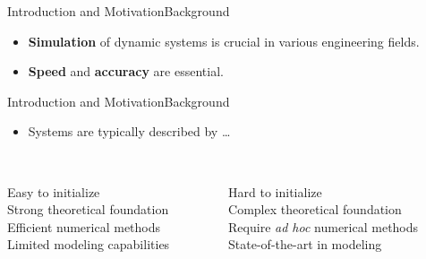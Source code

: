

\begin{frame}{Introduction and Motivation}{Background}
  \begin{itemize}
    \item \textbf{Simulation} of dynamic systems is crucial in various engineering fields.
    \item \textbf{Speed} and \textbf{accuracy} are essential.
  \end{itemize}
\end{frame}

\begin{frame}{Introduction and Motivation}{Background}
  \begin{itemize}
    \item Systems are typically described by \dots
  \end{itemize}
  \vspace{1.0em}
    \begin{columns}
      \centering
      \begin{column}[t]{0.45\textwidth}
        \centering
         \\
        \centering\small
        \textcolor{mycolor5!95!black}{Easy to initialize} \\
        \textcolor{mycolor5!95!black}{Strong theoretical foundation} \\
        \textcolor{mycolor5!95!black}{Efficient numerical methods} \\
        \textcolor{mycolor2!95!black}{Limited modeling capabilities} \\ %
      \end{column}
      \begin{column}[t]{0.45\textwidth}
        \centering
         \\
        \centering\small
        \textcolor{mycolor2!90!black}{Hard to initialize} \\
        \textcolor{mycolor3!90!black}{Complex theoretical foundation} \\
        \textcolor{mycolor3!90!black}{Require \emph{ad hoc} numerical methods} \\
        \textcolor{mycolor5!90!black}{State-of-the-art in modeling} \\
      \end{column}
    \end{columns}
  \vspace{0.5em}
\end{frame}

